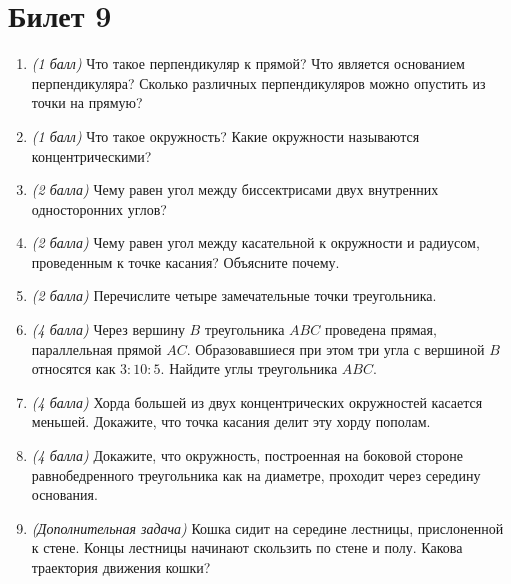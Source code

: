 \documentclass[12pt, a4paper]{article}
\begin{document}
\section*{Билет 9}
\begin{enumerate}
\item \textit{(1 балл)} Что такое перпендикуляр к прямой? Что является основанием перпендикуляра? Сколько различных перпендикуляров можно опустить из точки на прямую?
\item \textit{(1 балл)} Что такое окружность? Какие окружности называются концентрическими?
\item \textit{(2 балла)} Чему равен угол между биссектрисами двух внутренних односторонних углов?
\item \textit{(2 балла)} Чему равен угол между касательной к окружности и радиусом, проведенным к точке касания? Объясните почему.
\item \textit{(2 балла)} Перечислите четыре замечательные точки треугольника.
\item \textit{(4 балла)} Через вершину $B$ треугольника $ABC$ проведена прямая, параллельная прямой $AC$. Образовавшиеся при этом три угла с вершиной $B$ относятся как $3 : 10 : 5$. Найдите углы треугольника $ABC$.
\item \textit{(4 балла)} Хорда большей из двух концентрических окружностей касается меньшей. Докажите, что точка касания делит эту хорду пополам.
\item \textit{(4 балла)} Докажите, что окружность, построенная на боковой стороне равнобедренного треугольника как на диаметре, проходит через середину основания.
\item \textit{(Дополнительная задача)} Кошка сидит на середине лестницы, прислоненной к стене. Концы лестницы начинают скользить по стене и полу. Какова траектория движения кошки?
\end{enumerate}
\end{document}
